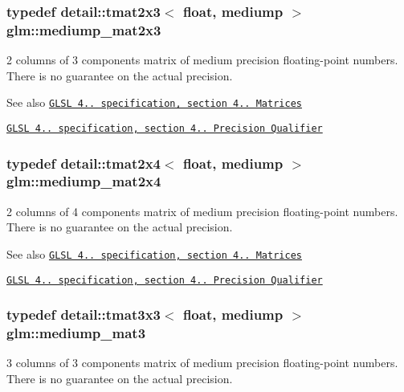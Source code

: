 \subsubsection[{\texorpdfstring{mediump\+\_\+mat2x3}{mediump_mat2x3}}]{\setlength{\rightskip}{0pt plus 5cm}typedef detail\+::tmat2x3$<$ float, mediump $>$ {\bf glm\+::mediump\+\_\+mat2x3}}\hypertarget{group__core__precision_gad4e099c0dfa8f35ce9c0ddc8605428cf}{}\label{group__core__precision_gad4e099c0dfa8f35ce9c0ddc8605428cf}
2 columns of 3 components matrix of medium precision floating-\/point numbers. There is no guarantee on the actual precision.

\begin{DoxySeeAlso}{See also}
\href{http://www.opengl.org/registry/doc/GLSLangSpec.4.20.8.pdf}{\tt G\+L\+SL 4.. specification, section 4.. Matrices} 

\href{http://www.opengl.org/registry/doc/GLSLangSpec.4.20.8.pdf}{\tt G\+L\+SL 4.. specification, section 4.. Precision Qualifier} 
\end{DoxySeeAlso}
\subsubsection[{\texorpdfstring{mediump\+\_\+mat2x4}{mediump_mat2x4}}]{\setlength{\rightskip}{0pt plus 5cm}typedef detail\+::tmat2x4$<$ float, mediump $>$ {\bf glm\+::mediump\+\_\+mat2x4}}\hypertarget{group__core__precision_gae90cf4be1ded03a3a5b7b42045da253c}{}\label{group__core__precision_gae90cf4be1ded03a3a5b7b42045da253c}
2 columns of 4 components matrix of medium precision floating-\/point numbers. There is no guarantee on the actual precision.

\begin{DoxySeeAlso}{See also}
\href{http://www.opengl.org/registry/doc/GLSLangSpec.4.20.8.pdf}{\tt G\+L\+SL 4.. specification, section 4.. Matrices} 

\href{http://www.opengl.org/registry/doc/GLSLangSpec.4.20.8.pdf}{\tt G\+L\+SL 4.. specification, section 4.. Precision Qualifier} 
\end{DoxySeeAlso}
\subsubsection[{\texorpdfstring{mediump\+\_\+mat3}{mediump_mat3}}]{\setlength{\rightskip}{0pt plus 5cm}typedef detail\+::tmat3x3$<$ float, mediump $>$ {\bf glm\+::mediump\+\_\+mat3}}\hypertarget{group__core__precision_gacf45e22f1fb2703b181995676963a1f9}{}\label{group__core__precision_gacf45e22f1fb2703b181995676963a1f9}
3 columns of 3 components matrix of medium precision floating-\/point numbers. There is no guarantee on the actual precision.

